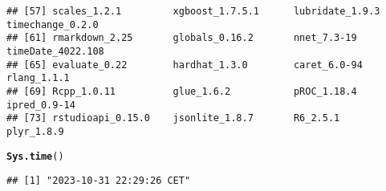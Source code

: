 \documentclass{article}\usepackage[]{graphicx}\usepackage[]{xcolor}
\makeatletter
\newcommand{\hlstd}[1]{\textcolor[rgb]{0.345,0.345,0.345}{#1}}%
\newcommand{\hlkwd}[1]{\textcolor[rgb]{0.737,0.353,0.396}{\textbf{#1}}}%
\newenvironment{kframe}{%
 \def\at@end@of@kframe{}%
 \ifinner\ifhmode%
  \def\at@end@of@kframe{\end{minipage}}%
  \begin{minipage}{\columnwidth}%
 \fi\fi%
 \def\FrameCommand##1{\hskip\@totalleftmargin \hskip-\fboxsep
 \colorbox{shadecolor}{##1}\hskip-\fboxsep
     \hskip-\linewidth \hskip-\@totalleftmargin \hskip\columnwidth}%
 \MakeFramed {\advance\hsize-\width
   \@totalleftmargin\z@ \linewidth\hsize
   \@setminipage}}%
 {\par\unskip\endMakeFramed%
 \at@end@of@kframe}
\newenvironment{knitrout}{}{} %
\makeatother
\begin{document}
\begin{knitrout}
\begin{kframe}
\begin{verbatim}
## [57] scales_1.2.1         xgboost_1.7.5.1      lubridate_1.9.3      timechange_0.2.0    
## [61] rmarkdown_2.25       globals_0.16.2       nnet_7.3-19          timeDate_4022.108   
## [65] evaluate_0.22        hardhat_1.3.0        caret_6.0-94         rlang_1.1.1         
## [69] Rcpp_1.0.11          glue_1.6.2           pROC_1.18.4          ipred_0.9-14        
## [73] rstudioapi_0.15.0    jsonlite_1.8.7       R6_2.5.1             plyr_1.8.9
\end{verbatim}
\begin{alltt}
\hlkwd{Sys.time}\hlstd{()}
\end{alltt}
\begin{verbatim}
## [1] "2023-10-31 22:29:26 CET"
\end{verbatim}
\end{kframe}
\end{knitrout}
\end{document}
